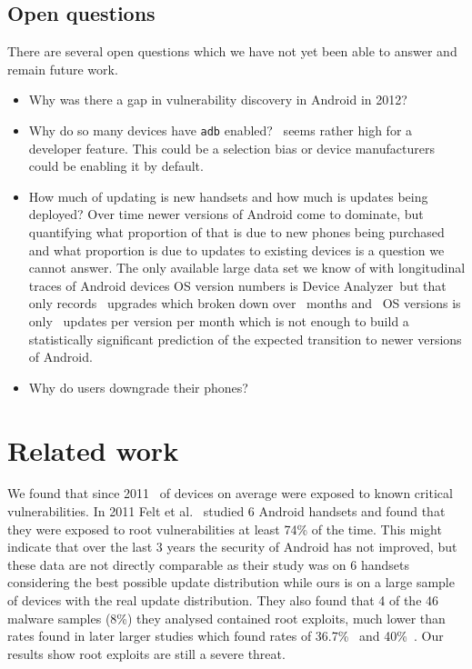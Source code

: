 \documentclass[conference,a4paper,twoside]{IEEEtran}
\newcommand{\da}{Device Analyzer}
\begin{document}
\subsection{Open questions}
There are several open questions which we have not yet been able to answer and remain future work.
\begin{itemize}
 \item Why was there a gap in vulnerability discovery in Android in 2012?
 \item Why do so many devices have \texttt{adb} enabled? \daAdbEnabledPerc\ seems rather high for a developer feature. This could be a selection bias or device manufacturers could be enabling it by default.
 \item How much of updating is new handsets and how much is updates being deployed? Over time newer versions of Android come to dominate, but quantifying what proportion of that is due to new phones being purchased and what proportion is due to updates to existing devices is a question we cannot answer.
 The only available large data set we know of with longitudinal traces of Android devices OS version numbers is \da\ but that only records \daNumUpdatesUpgrades\ upgrades which broken down over \daOSMonthsOfData\ months and \daNumSigOSVersions\ OS versions is only \daUpdatesPerMonthPerVersion\ updates per version per month which is not enough to build a statistically significant prediction of the expected transition to newer versions of Android.
 \item Why do users downgrade their phones?
\end{itemize}


\section{Related work}
\label{sec:related}
We found that since 2011 \daMeanInsecurityPerc\ of devices on average were exposed to known critical vulnerabilities.
In 2011 Felt et al.\ \cite{Felt2011} studied 6 Android handsets and found that they were exposed to root vulnerabilities at least 74\% of the time.
This might indicate that over the last 3 years the security of Android has not improved, but these data are not directly comparable as their study was on 6 handsets considering the best possible update distribution while ours is on a large sample of devices with the real update distribution.
They also found that 4 of the 46 malware samples (8\%) they analysed contained root exploits, much lower than rates found in later larger studies which found rates of 36.7\%~\cite{Zhou2012b} and 40\%~\cite{Zhou2012a}.
Our results show root exploits are still a severe threat.
\end{document}
